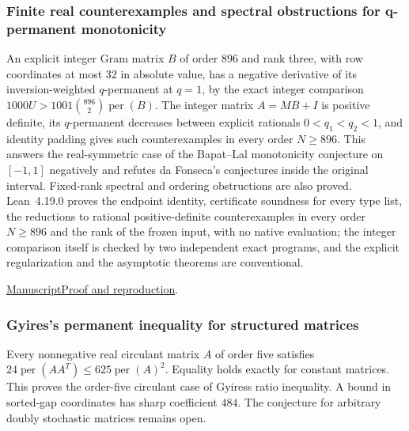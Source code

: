 \documentclass[11pt,a4paper]{article}
\begin{document}
\subsubsection{Finite real counterexamples and spectral obstructions for q-permanent monotonicity}

An explicit integer Gram matrix $B$ of order $896$ and rank three, with row coordinates at most $32$ in absolute value, has a negative derivative of its inversion-weighted $q$-permanent at $q=1$, by the exact integer comparison $1000U>1001\binom{896}{2}\operatorname{per}(B)$. The integer matrix $A=MB+I$ is positive definite, its $q$-permanent decreases between explicit rationals $0<q_1<q_2<1$, and identity padding gives such counterexamples in every order $N\ge896$. This answers the real-symmetric case of the Bapat--Lal monotonicity conjecture on $[-1,1]$ negatively and refutes da Fonseca's conjectures inside the original interval. Fixed-rank spectral and ordering obstructions are also proved. Lean~4.19.0 proves the endpoint identity, certificate soundness for every type list, the reductions to rational positive-definite counterexamples in every order $N\ge896$ and the rank of the frozen input, with no native evaluation; the integer comparison itself is checked by two independent exact programs, and the explicit regularization and the asymptotic theorems are conventional.

\par\smallskip

\noindent\href{https://github.com/dvgyl/math-and-theory/blob/main/papers/mathematics/q-permanent-finite/manuscript.pdf}{Manuscript}\quad\href{https://github.com/dvgyl/math-and-theory/blob/main/papers/mathematics/q-permanent-finite/README.md}{Proof and reproduction}.

\subsubsection{Gyires's permanent inequality for structured matrices}

Every nonnegative real circulant matrix $A$ of order five satisfies $24\operatorname{per}(AA^T)\leq625\operatorname{per}(A)^2$. Equality holds exactly for constant matrices. This proves the order-five circulant case of Gyires\textquotesingle s ratio inequality. A bound in sorted-gap coordinates has sharp coefficient $484$. The conjecture for arbitrary doubly stochastic matrices remains open.

\par\smallskip
\end{document}
